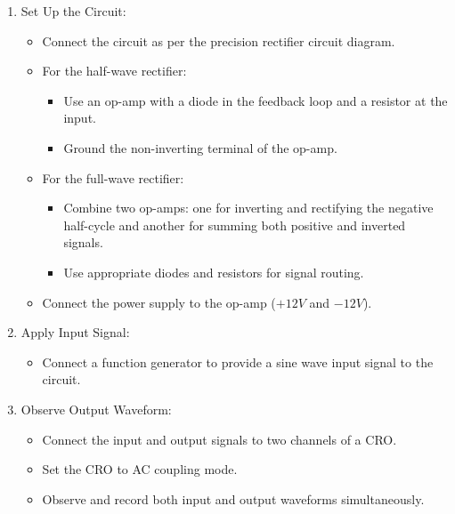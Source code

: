 \documentclass[journal]{IEEEtran}
\begin{document}
	\begin{enumerate}
		\item Set Up the Circuit:
		\begin{itemize}
			\item Connect the circuit as per the precision rectifier circuit diagram.
			\item For the half-wave rectifier:
			\begin{itemize}
				\item Use an op-amp with a diode in the feedback loop and a resistor at the input.
				\item Ground the non-inverting terminal of the op-amp.
			\end{itemize}
			\item For the full-wave rectifier:
			\begin{itemize}
				\item Combine two op-amps: one for inverting and rectifying the negative half-cycle and another for summing both positive and inverted signals.
				\item Use appropriate diodes and resistors for signal routing.
			\end{itemize}
			\item Connect the power supply to the op-amp (\(+12V\) and \(-12V\)).
		\end{itemize}
		
		\item Apply Input Signal:
		\begin{itemize}
			\item Connect a function generator to provide a sine wave input signal to the circuit.
		\end{itemize}
		
		\item Observe Output Waveform:
		\begin{itemize}
			\item Connect the input and output signals to two channels of a CRO.
			\item Set the CRO to AC coupling mode.
			\item Observe and record both input and output waveforms simultaneously.
		\end{itemize}
		

\end{enumerate}
\end{document}
